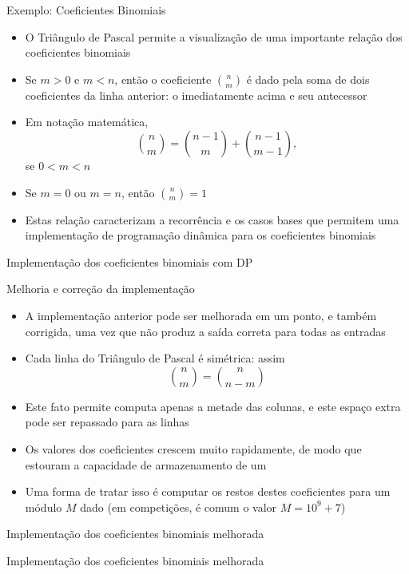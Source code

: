 \begin{frame}[fragile]{Exemplo: Coeficientes Binomiais}

    \begin{itemize}
        \item O Triângulo de Pascal permite a visualização de uma importante relação dos
            coeficientes binomiais

        \item Se $m > 0$ e $m < n$, então o coeficiente $\binom{n}{m}$ é dado pela soma de
            dois coeficientes da linha anterior: o imediatamente acima e seu antecessor

        \item Em notação matemática,
        \[
            \binom{n}{m} = \binom{n - 1}{m} + \binom{n - 1}{m - 1},
        \]
        se $0 < m < n$

        \item Se $m = 0$ ou $m = n$, então $\binom{n}{m} = 1$

        \item Estas relação caracterizam a recorrência e os casos bases que permitem uma
            implementação de programação dinâmica para os coeficientes binomiais
    \end{itemize}

\end{frame}

\begin{frame}[fragile]{Implementação dos coeficientes binomiais com DP}
\end{frame}

\begin{frame}[fragile]{Melhoria e correção da implementação}

    \begin{itemize}
        \item A implementação anterior pode ser melhorada em um ponto, e também corrigida,
            uma vez que não produz a saída correta para todas as entradas

        \item Cada linha do Triângulo de Pascal é simétrica: assim
        \[
            \binom{n}{m} = \binom{n}{n - m}
        \]

        \item Este fato permite computa apenas a metade das colunas, e este espaço extra pode
            ser repassado para as linhas

        \item Os valores dos coeficientes crescem muito rapidamente, de modo que estouram a
            capacidade de armazenamento de um 

        \item Uma forma de tratar isso é computar os restos destes coeficientes para um módulo
            $M$ dado (em competições, é comum o valor $M = 10^9 + 7$)
    \end{itemize}

\end{frame}

\begin{frame}[fragile]{Implementação dos coeficientes binomiais melhorada}
\end{frame}

\begin{frame}[fragile]{Implementação dos coeficientes binomiais melhorada}
\end{frame}
